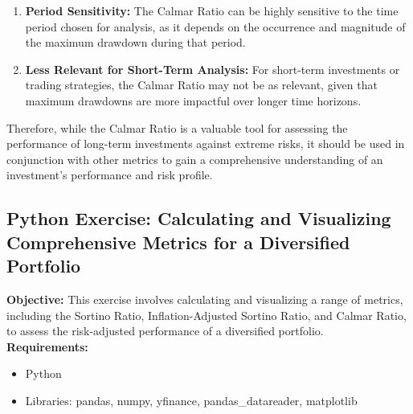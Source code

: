 \documentclass{article}
\begin{document}
\begin{enumerate}
    \item \textbf{Period Sensitivity:} The Calmar Ratio can be highly sensitive to the time period chosen for analysis, as it depends on the occurrence and magnitude of the maximum drawdown during that period.
    \item \textbf{Less Relevant for Short-Term Analysis:} For short-term investments or trading strategies, the Calmar Ratio may not be as relevant, given that maximum drawdowns are more impactful over longer time horizons.
\end{enumerate}

Therefore, while the Calmar Ratio is a valuable tool for assessing the performance of long-term investments against extreme risks, it should be used in conjunction with other metrics to gain a comprehensive understanding of an investment's performance and risk profile.


\subsection{Python Exercise: Calculating and Visualizing Comprehensive Metrics for a Diversified Portfolio}

\textbf{Objective:} This exercise involves calculating and visualizing a range of metrics, including the Sortino Ratio, Inflation-Adjusted Sortino Ratio, and Calmar Ratio, to assess the risk-adjusted performance of a diversified portfolio. \\

\textbf{Requirements:}
\begin{itemize}
    \item Python
    \item Libraries: pandas, numpy, yfinance, pandas\_datareader, matplotlib
\end{itemize}
\end{document}
